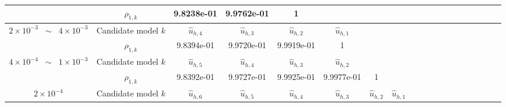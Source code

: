 \begin{table}[ht]
{\begin{tabular}{|c|c|c|c|c|c|c|c|c|c|c|c|c|c|c|c|c|c|c|}
\cline{2-5}
&\multicolumn{1}{|c|}{$\rho_{1,k}$}&9.8238e-01&9.9762e-01&1&&&\\
\hline
\multirow{2}{*}{$2\times 10^{-3}\;\;\sim \;\;4\times 10^{-3}$} &\multicolumn{1}{|c|}{Candidate model $k$} &$\widehat u_{h,4}$&$\widehat u_{h,3}$&$\widehat u_{h,2}$&$\widehat u_{h,1}$&\multirow{3}{*}{}&\multirow{3}{*}{}\\
\cline{2-6}	
&\multicolumn{1}{|c|}{$\rho_{1,k}$}&9.8394e-01&9.9720e-01 &9.9919e-01&1&&\\
\hline
\multirow{2}{*}{$4\times 10^{-4}\;\;\sim \;\;1\times 10^{-3}$} &\multicolumn{1}{|c|}{Candidate model $k$} &$\widehat u_{h,5}$&$\widehat u_{h,4}$&$\widehat u_{h,3}$&$\widehat u_{h,2}$&$\widehat u_{h,1}$&\multirow{3}{*}{}\\
\cline{2-7}	
&\multicolumn{1}{|c|}{$\rho_{1,k}$}&9.8392e-01 &9.9727e-01 &9.9925e-01 &9.9977e-01 &1 &\\
\hline
\multirow{2}{*}{$2\times 10^{-4}$} &\multicolumn{1}{|c|}{Candidate model $k$} &$\widehat u_{h,6}$&$\widehat u_{h,5}$&$\widehat u_{h,4}$&$\widehat u_{h,3}$&$\widehat u_{h,2}$&$\widehat u_{h,1}$\\

\end{tabular}}
\end{table}
